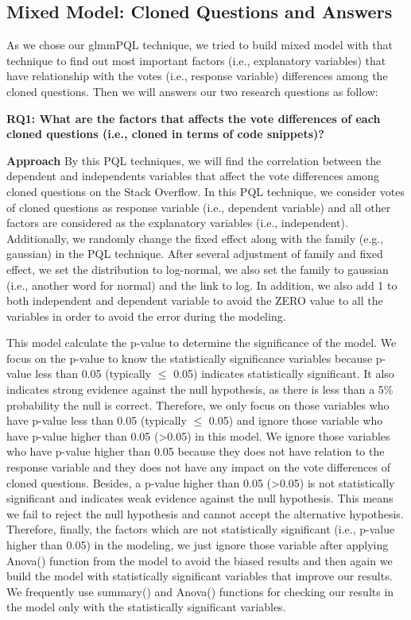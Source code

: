 \documentclass[conference]{IEEEtran}
\begin{document}
\subsection{Mixed Model: Cloned Questions and Answers}
As we chose our glmmPQL technique, we tried to build mixed model with that technique to find out most important factors (i.e., explanatory variables) that have relationship with the votes (i.e., response variable) differences among the cloned questions.  Then we will answers our two research questions as follow:
\newline 

\textbf{RQ1: What are the factors that affects the vote differences of each cloned questions (i.e., cloned in terms of code snippets)?}
\newline

\textbf{Approach} By this PQL techniques, we will find the correlation between the dependent and independents variables that affect the vote differences among cloned questions on the Stack Overflow.  In this PQL technique, we consider votes of cloned questions as response variable (i.e., dependent variable) and all other factors are considered as the  explanatory variables (i.e., independent). Additionally,  we randomly change the fixed effect along with the family (e.g., gaussian) in the PQL technique. After several adjustment of family and fixed effect, we set the distribution to log-normal, we also set the family to gaussian (i.e., another word for normal) and the link to log. In addition, we also add 1 to both independent and dependent variable to avoid the ZERO value to all the variables in order to avoid the error during the modeling. 

This model calculate the p-value to determine the significance of the model. We focus on the p-value to know the statistically significance variables because p-value less than 0.05 (typically $\leq$ 0.05) indicates statistically significant. It also indicates strong evidence against the null hypothesis, as there is less than a 5\% probability the null is correct. Therefore, we only focus on those variables who have p-value less than 0.05 (typically $\leq$ 0.05) and ignore those variable who have p-value higher than 0.05 (\textgreater 0.05) in this model. We ignore those variables who have p-value higher than 0.05  because they does not have  relation to the response variable and they does not have any impact on the vote differences of cloned questions. Besides, a p-value higher than 0.05 (\textgreater 0.05) is not statistically significant and indicates weak evidence against the null hypothesis. This means we fail to reject the null hypothesis and cannot accept the alternative hypothesis. Therefore, finally, the factors which are not statistically significant (i.e., p-value higher than 0.05) in the modeling, we just ignore those variable after applying Anova() function from the model to avoid the biased results and then again we build the model with statistically significant variables that improve our results. We frequently use summary() and Anova() functions for checking our results in the model only with the statistically significant variables. \newline
\end{document}
